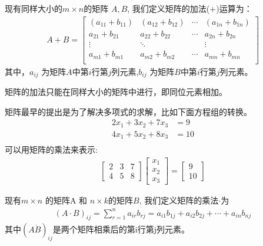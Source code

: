 \documentclass[12pt]{article}
\numberwithin{figure}{section}
\numberwithin{equation}{section}
\begin{document}
\begin{definition}
	现有同样大小的$m \times n$的矩阵 $A, B$, 我们定义矩阵的加法($+$)运算为：
	\begin{align*}
		A + B = \begin{bmatrix}
			(a_{11} + b_{11}) & (a_{12}+b_{12}) & \cdots & (a_{1n}+b_{1n}) \\
			a_{21} + b_{21} & a_{22}+b_{22} & \cdots & a_{2n}+b_{2n} \\
			\vdots & \ddots & & \vdots \\
			a_{m1} + b_{m1} & a_{m2}+b_{m2} & \cdots & a_{mn}+b_{mn} \\
		\end{bmatrix}
	\end{align*}
	其中，$a_{ij}$ 为矩阵$A$中第$i$行第$j$列元素,$b_{ij}$ 为矩阵$B$中第$i$行第$j$列元素。
\end{definition}

\begin{remark}
矩阵的加法只能在同样大小的矩阵中进行，即同位元素相加。	
\end{remark}

矩阵最早的提出是为了解决多项式的求解，比如下面方程组的转换。
\begin{align*}
	2x_1 + 3x_2 + 7x_3 & = 9 \\
	4x_1 + 5x_2 + 8 x_3 & = 10 \\
\end{align*}
可以用矩阵的乘法来表示:
\begin{align*}
	\begin{bmatrix}
		2 & 3 & 7 \\
		4 & 5 & 8 
	\end{bmatrix} \begin{bmatrix}
		x_1 \\
		x_2 \\
		x_3 
	\end{bmatrix} = \begin{bmatrix}
		 9 \\
		 10 
	\end{bmatrix}
\end{align*}

\begin{definition}
	现有$m \times n$ 的矩阵A 和 $n \times k$的矩阵$B$, 我们定义矩阵的乘法$\cdot$为
	\begin{align*}
		(A \cdot B)_{ij} = \sum_{r=1}^n a_{ir}b_{rj} = a_{i1}b_{1j} + a_{i2}b_{2j} + \cdots + a_{in}b_{nj}
	\end{align*}
	其中$(A \dot B)_{ij}$是两个矩阵相乘后的第i行第j列元素。
\end{definition}
\end{document}
